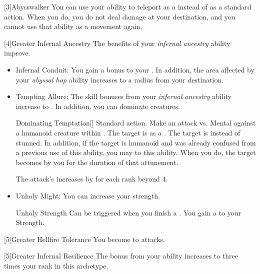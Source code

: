     [3]{Abysswalker} You can use your  ability to teleport as a  instead of as a standard action.
      When you do, you do not deal damage at your destination, and you  cannot use that ability as a movement again.

    [4]{Greater Infernal Ancestry} The benefits of your \textit{infernal ancestry} ability improve.
      \begin{itemize}
        \item Infernal Conduit: You gain a  bonus to your .
          In addition, the area affected by your \textit{abyssal hop} ability increases to a \smallarea radius from your destination.
        \item Tempting Allure: The skill bonuses from your \textit{infernal ancestry} ability increase to .
          In addition, you can dominate creatures.
          \begin{magicalactiveability}{Dominating Temptation}[]
            \abilityusagetime Standard action.
            \rankline
            Make an attack vs. Mental against a humanoid creature within \shortrange.
            \hit The target is \stunned as a .
            \crit The target is \confused instead of stunned.
            In addition, if the target is humanoid and was already confused from a previous use of this ability, you may  to this ability.
            When you do, the target becomes \dominated by you for the duration of that attunement.

            \rankline
            \noindent The attack's  increases by  for each rank beyond 4.
          \end{magicalactiveability}
        \item Unholy Might: You can increase your strength.
          \begin{magicalattuneability}{Unholy Strength}{}
            \abilityusagetime Can be triggered when you finish a .
            \rankline
            You gain a   to your Strength.
          \end{magicalattuneability}
      \end{itemize}

    [5]{Greater Hellfire Tolerance} You become  to \atFire attacks.

    [5]{Greater Infernal Resilience}  The bonus from your  ability increases to three times your rank in this archetype.

